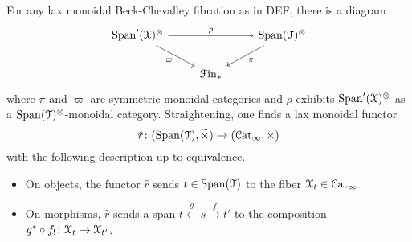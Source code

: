 \documentclass[main.tex]{subfiles}
\begin{document}
\begin{proposition}
  For any lax monoidal Beck-Chevalley fibration as in DEF, there is a diagram
  \begin{equation*}
    \begin{tikzcd}
      \Span'(\category{X})^{\otimes}
      \arrow[rr, "\rho"]
      \arrow[dr, swap, "\varpi"]
      && \Span(\category{T})^{\otimes}
      \arrow[dl, "\pi"]
      \\
      & \Finp
    \end{tikzcd}
  \end{equation*}
  where $\pi$ and $\varpi$ are symmetric monoidal categories and $\rho$ exhibits $\mathrm{Span}'(\mathcal{X})^{\otimes}$ as a $\mathrm{Span}(\mathcal{T})^{\otimes}$-monoidal category. Straightening, one finds a lax monoidal functor
  \begin{equation*}
    \hat{r}\colon (\mathrm{Span}(\mathcal{T}), \widetilde{\times}) \to (\mathcal{C}\mathrm{at}_{\infty}, \times)
  \end{equation*}
  with the following description up to equivalence.
  \begin{itemize}
    \item On objects, the functor $\hat{r}$ sends $t \in \mathrm{Span}(\mathcal{T})$ to the fiber $\mathcal{X}_{t} \in \mathcal{C}\mathrm{at}_{\infty}$
    \item On morphisms, $\hat{r}$ sends a span $t \overset{g}{\leftarrow} s \overset{f}{\to} t'$ to the composition $g^{*} \circ f_{!}\colon \mathcal{X}_{t} \to \mathcal{X}_{t'}$.
  \end{itemize}
\end{proposition}
\end{document}
